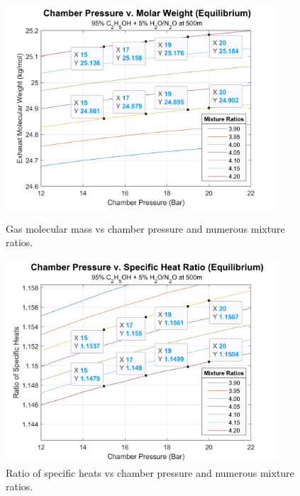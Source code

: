 \documentclass[9pt]{article} %
\numberwithin{equation}{section} %
\begin{document}
\begin{figure}[H]
    \centering
    \begin{minipage}{0.475\textwidth}
        \centering
        \includegraphics[scale=0.5, width=0.9\textwidth]{cp_molar_mix_labeled} %
        \caption{Gas molecular mass vs chamber pressure and numerous mixture ratios.}
        \label{fig:cp_molar}
    \end{minipage}\hfill
    \begin{minipage}{0.475\textwidth}
        \centering
        \includegraphics[scale=0.5, width=0.9\textwidth]{cp_gamma_mix_labeled} %
        \caption{Ratio of specific heats vs chamber pressure and numerous mixture ratios.}
        \label{fig:cp_gamma}
    \end{minipage}
\end{figure}
\end{document}
